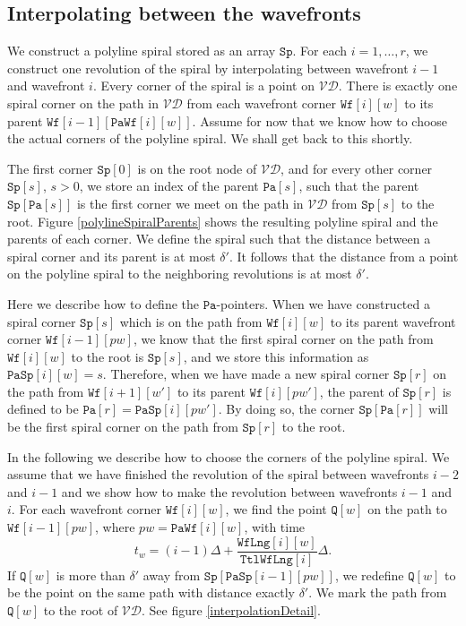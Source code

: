 \documentclass[3p]{elsarticle}
\newcommand{\VD}{\mathcal{VD}}
\newcommand{\stepover}{\delta}
\newcommand{\tStepover}{\Delta}
\newcommand{\wavefront}{\texttt{Wf}}
\newcommand{\wavefrontLength}{\wavefront\texttt{Lng}}
\newcommand{\totalWavefrontLength}{\texttt{Ttl}\wavefrontLength}
\newcommand{\spiral}{\texttt{Sp}}
\newcommand{\parent}{\texttt{Pa}}
\newcommand{\parentWavefrontCorner}{\parent\wavefront}
\newcommand{\parentSpiralCorner}{\parent\spiral}
\begin{document}
\subsection{Interpolating between the wavefronts}\label{interpolating}

We construct a polyline spiral stored as an array $\spiral$. For each $i=1,\ldots, r$, we construct one
revolution of the spiral by interpolating between wavefront $i-1$ and wavefront $i$. Every
corner of the spiral is a point on $\VD$. There is exactly one spiral corner
on the path in $\VD$ from each wavefront corner $\wavefront[i][w]$ to its parent
$\wavefront[i-1][\parentWavefrontCorner[i][w]]$.
Assume for now that we know how to choose the actual corners of the polyline spiral. We shall get
back to this shortly.

The first corner $\spiral[0]$ is on the root node of $\VD$, and for every other
corner $\spiral[s]$, $s>0$, we store an index of the parent $\parent[s]$,
such that the parent $\spiral[\parent[s]]$
is the first corner we meet on the path in $\VD$ from $\spiral[s]$ to the root.
Figure \ref{polylineSpiralParents} shows the resulting polyline spiral and the parents of each corner.
We define the spiral
such that the distance between a spiral corner and its parent is at most $\stepover'$. It follows that
the distance from a point on the polyline spiral to the neighboring revolutions is at most $\stepover'$.

Here we describe how to define the $\parent$-pointers.
When we have constructed
a spiral corner $\spiral[s]$ which is on the path from $\wavefront[i][w]$ to its parent wavefront
corner $\wavefront[i-1][pw]$, we know that the first spiral corner on the path from
$\wavefront[i][w]$ to the root is $\spiral[s]$, and we store this information as
$\parentSpiralCorner[i][w]=s$.
Therefore, when we have made a new spiral corner $\spiral[r]$ on the path from $\wavefront[i+1][w']$
to its parent $\wavefront[i][pw']$, the parent of $\spiral[r]$ is defined to be
$\parent[r]=\parentSpiralCorner[i][pw']$. By doing so, the corner
$\spiral[\parent[r]]$ will be
the first spiral corner on the path from $\spiral[r]$ to the root.

In the following we describe how to choose the corners of the polyline spiral.
We assume that we have finished the revolution of the spiral between wavefronts $i-2$ and
$i-1$ and we show how to make the revolution between wavefronts $i-1$ and $i$.
For each wavefront corner $\wavefront[i][w]$, we find the point $\texttt{Q}[w]$ on the path to
$\wavefront[i-1][pw]$, where $pw=\parentWavefrontCorner[i][w]$, with time
$$t_w=(i-1)\tStepover + \frac{\wavefrontLength[i][w]}{\totalWavefrontLength[i]}\tStepover.$$
If $\texttt{Q}[w]$ is more than $\stepover'$ away from
$\spiral[\parentSpiralCorner[i-1][pw]]$, we redefine $\texttt{Q}[w]$ to be the point on the same path
with distance exactly $\stepover'$.
We mark the path from $\texttt{Q}[w]$ to the root of $\VD$.
See figure \ref{interpolationDetail}.
\end{document}
